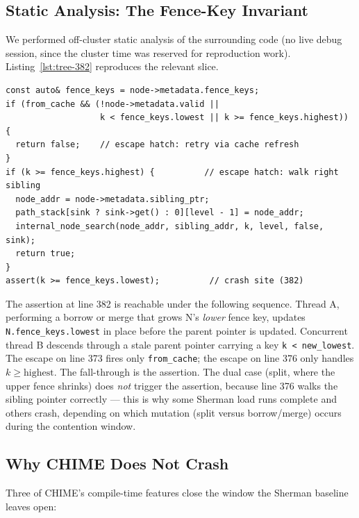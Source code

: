 \documentclass[11pt,a4paper]{article}
\begin{document}
\subsection{Static Analysis: The Fence-Key Invariant}
\label{sec:stress-static-analysis}

We performed off-cluster static analysis of the surrounding code (no live debug session, since the cluster time was reserved for reproduction work). Listing~\ref{lst:tree-382} reproduces the relevant slice.

\begin{lstlisting}[caption={\texttt{src/Tree.cpp}, lines 372--385: the assertion site at 382 has escape hatches for cache-staleness and for $k \ge \mathrm{highest}$, but \emph{not} for $k < \mathrm{lowest}$ on a non-cached read.},label={lst:tree-382}]
const auto& fence_keys = node->metadata.fence_keys;
if (from_cache && (!node->metadata.valid ||
                   k < fence_keys.lowest || k >= fence_keys.highest)) {
  return false;    // escape hatch: retry via cache refresh
}
if (k >= fence_keys.highest) {          // escape hatch: walk right sibling
  node_addr = node->metadata.sibling_ptr;
  path_stack[sink ? sink->get() : 0][level - 1] = node_addr;
  internal_node_search(node_addr, sibling_addr, k, level, false, sink);
  return true;
}
assert(k >= fence_keys.lowest);          // crash site (382)
\end{lstlisting}

The assertion at line 382 is reachable under the following sequence. Thread A, performing a borrow or merge that grows N's \emph{lower} fence key, updates \texttt{N.fence\_keys.lowest} in place before the parent pointer is updated. Concurrent thread B descends through a stale parent pointer carrying a key \texttt{k < new\_lowest}. The escape on line 373 fires only \texttt{from\_cache}; the escape on line 376 only handles $k \ge \mathrm{highest}$. The fall-through is the assertion. The dual case (split, where the upper fence shrinks) does \emph{not} trigger the assertion, because line 376 walks the sibling pointer correctly --- this is why some Sherman load runs complete and others crash, depending on which mutation (split versus borrow/merge) occurs during the contention window.

\subsection{Why CHIME Does Not Crash}
\label{sec:stress-why-chime}

Three of CHIME's compile-time features close the window the Sherman baseline leaves open:
\end{document}
